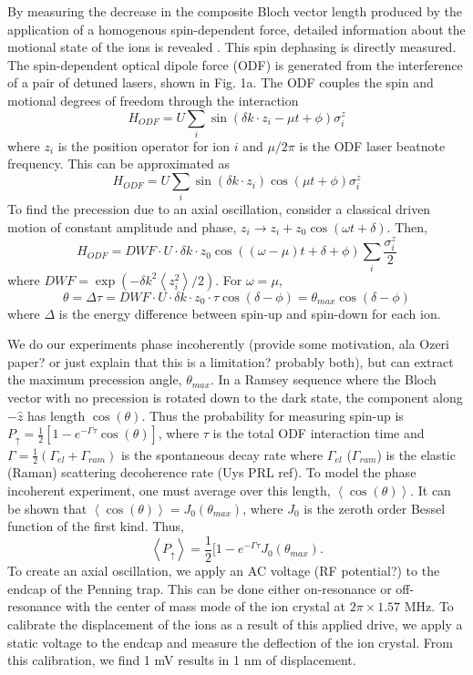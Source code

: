 \documentclass[aps,prl,twocolumn,groupedaddress]{revtex4-1}
\begin{document}
By measuring the decrease in the composite Bloch vector length produced by the application of a homogenous spin-dependent force, detailed information about the motional state of the ions is revealed \cite{}. This spin dephasing  is directly measured. The spin-dependent optical dipole force (ODF) is generated from the interference of a pair of detuned lasers, shown in Fig. 1a. The ODF couples the spin and motional degrees of freedom through the interaction 
\begin{equation}
H_{ODF} = U\sum_{i}\sin(\delta k \cdot z_i - \mu t + \phi)\sigma^{z}_i
\end{equation}
where $z_i$ is the position operator for ion $i$ and $\mu/2\pi$ is the ODF laser beatnote frequency. This can be approximated as
\[H_{ODF} = U\sum_{i}\sin(\delta k \cdot z_i)\cos(\mu t + \phi)\sigma^{z}_i \]
To find the precession due to an axial oscillation, consider a classical driven motion of constant amplitude and phase, $z_i \rightarrow z_i +z_0\cos(\omega t+\delta)$.
Then,
\[H_{ODF} = DWF \cdot U \cdot \delta k \cdot z_0\cos((\omega - \mu)t + \delta + \phi) \sum_{i} \frac{\sigma^{z}_{i}}{2} \]
where $DWF = \exp(-\delta k^2 \left< z^{2}_{i} \right> /2) $.
For $ \omega = \mu $,
\[\theta = \Delta\tau = DWF \cdot U \cdot \delta k \cdot z_0 \cdot \tau \cos(\delta - \phi) = \theta_{max}\cos(\delta - \phi)\]
where $\Delta$ is the energy difference between spin-up and spin-down for each ion.

We do our experiments phase incoherently (provide some motivation, ala Ozeri paper? or just explain that this is a limitation? probably both), but can extract the maximum precession angle, $\theta_{max}$. In a Ramsey sequence where the Bloch vector with no precession is rotated down to the dark state, the component along $-\hat{z}$ has length $\cos(\theta)$. Thus the probability for measuring spin-up is $P_{\uparrow} = \frac{1}{2}[1-e^{-\Gamma \tau} \cos(\theta)]$, where $\tau$ is the total ODF interaction time and $\Gamma = \frac{1}{2}(\Gamma_{el} + \Gamma_{ram})$ is the spontaneous decay rate where $\Gamma_{el}$ ($\Gamma_{ram}$) is the elastic (Raman) scattering decoherence rate (Uys PRL ref). To model the phase incoherent experiment, one must average over this length, $ \left< \cos(\theta) \right> $. It can be shown that $ \left< \cos(\theta) \right> = J_0(\theta_{max}) $, where $J_0$ is the zeroth order Bessel function of the first kind. Thus,
\begin{equation}
\left< P_{\uparrow} \right> = \frac{1}{2} [1-e^{-\Gamma \tau}J_0(\theta_{max}).
\end{equation}
To create an axial oscillation, we apply an AC voltage (RF potential?) to the endcap of the Penning trap. This can be done either on-resonance or off-resonance with the center of mass mode of the ion crystal at $2\pi \times 1.57$ MHz. To calibrate the displacement of the ions as a result of this applied drive, we apply a static voltage to the endcap and measure the deflection of the ion crystal. From this calibration, we find 1 mV results in 1 nm of displacement.
\end{document}
